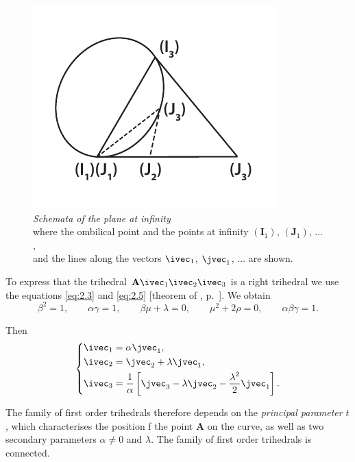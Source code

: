\begin{figure}[h]
  \centering
\includegraphics{cartangrp-f2}  
  \caption[]{\emph{Schemata of the plane at infinity}\\where the ombilical point and the points at infinity $(\mathbf{I}_{1})$, $(\mathbf{J}_{1})$, $\dots$,\\and the lines along the vectors $\ivec_{1}$, $\jvec_{1}$, $\dots$ are shown.}
\end{figure}

To express that the trihedral $\mathbf{A}\ivec_{1}\ivec_{2}\ivec_{3}$ is a right trihedral we use the equations \eqref{eq:2.3} and \eqref{eq:2.5} [theorem of , p.~\pageref{sec:23}]. We obtain
\[
\beta^{2}=1,\qquad\alpha\gamma=1,\qquad\beta\mu+\lambda=0,\qquad\mu^{2}+2\rho=0,\qquad\alpha\beta\gamma=1.
\]

Then
\begin{equation}
  \label{eq:2.11}
  \left\{
    \begin{aligned}
      \ivec_{1}&=\alpha\jvec_{1},\\
      \ivec_{2}&=\jvec_{2}+\lambda\jvec_{1},\\
      \ivec_{3}&=\frac{1}{\alpha}\left[\jvec_{3}-\lambda\jvec_{2}-\frac{\lambda^{2}}{2}\jvec_{1}\right].
    \end{aligned}
  \right.
\end{equation}

The family of first order trihedrals therefore depends on the \emph{principal parameter} $t$, which characterises the position f the point $\mathbf{A}$ on the curve, as well as two secondary parameters $\alpha\neq 0$ and $\lambda$. The family of first order trihedrals is connected.

\somespace

